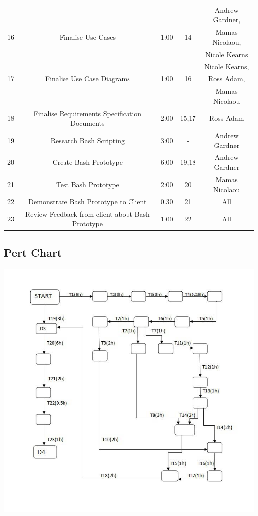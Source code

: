\documentclass{l3deliverable}
\begin{document}
{\begin{table}
\begin{tabular}{|c |c |c |c |c |}
\hline & &  & & Andrew Gardner, \\
 16&Finalise Use Cases &1:00 & 14& Mamas Nicolaou, \\
 &  & & &Nicole Kearns \\
\hline&  & & & Nicole Kearns, \\
 17 & Finalise Use Case Diagrams & 1:00& 16& Ross Adam, \\
 & &  & &Mamas Nicolaou \\
\hline18 & Finalise Requirements Specification Documents & 2:00 &15,17& Ross Adam \\
\hline19 & Research Bash Scripting & 3:00 &-&Andrew Gardner\\
\hline20 & Create Bash Prototype & 6:00 &19,18&Andrew Gardner \\
\hline21 & Test Bash Prototype & 2:00 &20& Mamas Nicolaou \\
\hline22 & Demonstrate Bash Prototype to Client& 0.30 &21& All\\     
\hline23 & Review Feedback from client about Bash Prototype & 1:00 &22& All\\      
\hline %
\end{tabular}
\label{table:nonlin} %
\end{table}
\pagebreak

\subsection{Pert Chart}
\includegraphics[scale=0.7]{img/PERT.jpg}

}
\end{document}
